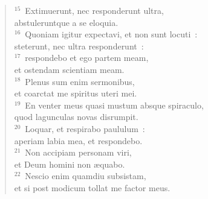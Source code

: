 \begin{flushleft}
\begin{verse}
${}^{15}$~Extimuerunt, nec responderunt ultra,\\ abstuleruntque a se eloquia.\\
${}^{16}$~Quoniam igitur expectavi, et non sunt locuti~:\\ steterunt, nec ultra responderunt~:\\
${}^{17}$~respondebo et ego partem meam,\\ et ostendam scientiam meam.\\
${}^{18}$~Plenus sum enim sermonibus,\\ et coarctat me spiritus uteri mei.\\
${}^{19}$~En venter meus quasi mustum absque spiraculo,\\ quod lagunculas novas disrumpit.\\
${}^{20}$~Loquar, et respirabo paululum~:\\ aperiam labia mea, et respondebo.\\
${}^{21}$~Non accipiam personam viri,\\ et Deum homini non \ae quabo.\\
${}^{22}$~Nescio enim quamdiu subsistam,\\ et si post modicum tollat me factor meus.\end{verse}\end{flushleft}


